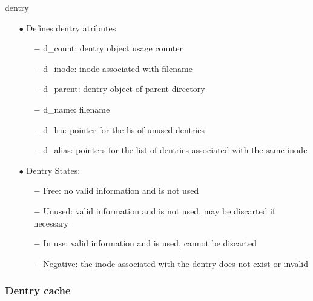 \documentclass{beamer}
\begin{document}
\begin{frame}{dentry}

	\begin{itemize}[<+->]
		\item[$\bullet$]{Defines dentry atributes}
			\begin{itemize}
				\item[$-$]{d\_count: dentry object usage counter}
				\item[$-$]{d\_inode: inode associated with filename}
				\item[$-$]{d\_parent: dentry object of parent directory}
				\item[$-$]{d\_name: filename}
				\item[$-$]{d\_lru: pointer for the lis of unused dentries}
				\item[$-$]{d\_alias: pointers for the list of dentries associated with the same inode}
			\end{itemize}

		\item[$\bullet$]{Dentry States:}
			\begin{itemize}
				\item[$-$]{Free: no valid information and is not used}
				\item[$-$]{Unused: valid information and is not used, may be discarted if necessary}
				\item[$-$]{In use: valid information and is used, cannot be discarted}
				\item[$-$]{Negative: the inode associated with the dentry does not exist or invalid}
			\end{itemize}
	\end{itemize}

\end{frame}


\subsubsection{Dentry cache}
\end{document}
